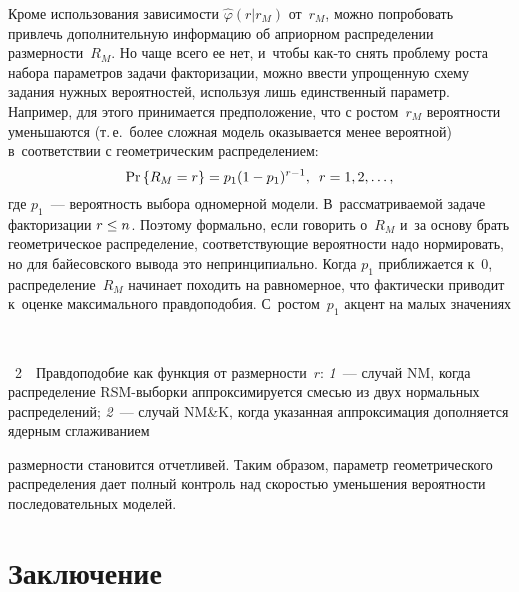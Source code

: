 \begin{multicols}{2}
     Кроме использования зависимости $\hat{\varphi}(r\vert r_M)$ от~$r_M$, 
можно попробовать привлечь дополнительную информацию об априорном 
распределении размерности~$R_M$. Но чаще всего ее нет, и~чтобы как-то 
снять проблему роста набора параметров задачи факторизации, можно ввести 
упрощенную схему задания нужных вероятностей, используя лишь 
единственный параметр. Например, для этого принимается предположение, что 
с ростом~$r_M$ вероятности уменьшаются (т.\,е.\ более сложная модель 
оказывается менее вероятной) в~соответствии с геометрическим 
распределением:
     $$
     \mathrm{Pr}\left\{ R_M=r\right\} = p_1(1-p_1)^{r-1}, \enskip r=1,2,\ldots ,
     $$
где $p_1$~--- вероятность выбора одномерной модели. В~рассматриваемой 
задаче факторизации $r\hm\leq n$. Поэтому формально, если говорить о~$R_M$ и~за основу брать геометрическое распределение, соответствующие 
вероятности надо нормировать, но для байесовского вывода это 
непринципиально. Когда $p_1$ при\-бли\-жа\-ет\-ся к~0, распределение~$R_M$
начинает походить на равномерное, что фактически приводит к~оценке 
максимального правдоподобия. С~рос\-том~$p_1$ акцент на малых значениях\linebreak\vspace*{-12pt}

     { \begin{center}  %
 \vspace*{6pt}
    \mbox{%
\epsfxsize=73.476mm 
}

\end{center}



\noindent
{{\figurename~2}\ \ \small{Правдоподобие как функция от размерности~$r$: \textit{1}~--- случай NM, когда 
распределение  
RSM-вы\-бор\-ки аппроксимируется смесью из двух нормальных распределений; \textit{2}~--- случай 
NM\&K, когда указанная аппроксимация дополняется ядерным сглаживанием
}}}


\addtocounter{figure}{1}

\noindent 
раз\-мер\-ности становится отчетливей. Таким образом, параметр гео\-мет\-ри\-че\-ско\-го 
распределения дает полный контроль над ско\-ростью уменьшения ве\-ро\-ят\-ности 
по\-сле\-до\-ва\-тель\-ных моделей. 

\section{Заключение}
     

\end{multicols}
